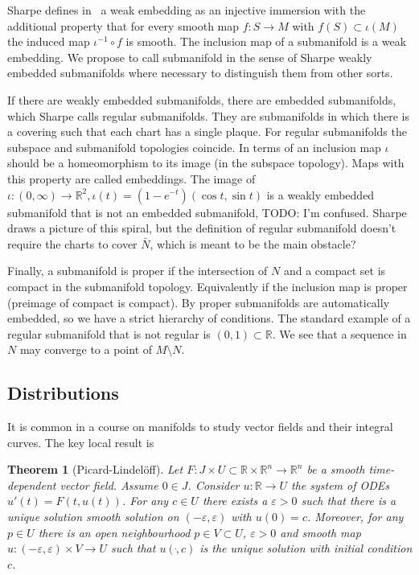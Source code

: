 \documentclass[twoside,11pt,a4paper,leqno]{article}
\numberwithin{equation}{section}
\theoremstyle{plain}
\newtheorem{theorem}[equation]{Theorem}
\theoremstyle{definition}
\newcommand{\bbR}{\mathbb{R}}
\begin{document}
Sharpe defines in~\cite[Definition~1.1.4]{Sharpe1997} a weak embedding as an injective immersion with the additional property that for every smooth map $f : S \to M$ with $f(S) \subset \iota(M)$ the induced map $\iota^{-1} \circ f$ is smooth.
The inclusion map of a submanifold is a weak embedding.
We propose to call submanifold in the sense of Sharpe weakly embedded submanifolds where necessary to distinguish them from other sorts.

If there are weakly embedded submanifolds, there are embedded submanifolds, which Sharpe calls regular submanifolds.
They are submanifolds in which there is a covering such that each chart has a single plaque.
For regular submanifolds the subspace and submanifold topologies coincide.
In terms of an inclusion map $\iota$ should be a homeomorphism to its image (in the subspace topology).
Maps with this property are called embeddings.
The image of $\iota : (0,\infty) \to \bbR^2, \iota(t) = (1-e^{-t})(\cos t, \sin t)$ is a weakly embedded submanifold that is not an embedded submanifold, 
TODO: I'm confused. Sharpe draws a picture of this spiral, but the definition of regular submanifold doesn't require the charts to cover $\bar{N}$, which is meant to be the main obstacle?

Finally, a submanifold is proper if the intersection of $N$ and a compact set is compact in the submanifold topology.
Equivalently if the inclusion map is proper (preimage of compact is compact).
By \cite[Theorem~1.2.11]{Sharpe1997} proper submanifolds are automatically embedded, so we have a strict hierarchy of conditions.
The standard example of a regular submanifold that is not regular is $(0,1) \subset \bbR$.
We see that a sequence in $N$ may converge to a point of $M\setminus N$.


\subsection{Distributions}

It is common in a course on manifolds to study vector fields and their integral curves.
The key local result is
\begin{theorem}[Picard-Lindelöff]
Let $F : J \times U \subset \bbR\times\bbR^n \to \bbR^n$ be a smooth time-dependent vector field. 
Assume $0 \in J$. 
Consider $u : \bbR \to U$ the system of ODEs $u'(t) = F(t,u(t))$.
For any $c \in U$ there exists a $\varepsilon > 0$ such that there is a unique solution smooth solution on $(-\varepsilon,\varepsilon)$ with $u(0) = c$.
Moreover, for any $p \in U$ there is an open neighbourhood $p \in V \subset U$, $\varepsilon > 0$ and smooth map $u : (-\varepsilon,\varepsilon) \times V \to U$ such that $u(\dot,c)$ is the unique solution with initial condition $c$.
\\\textup{\cite[Theorem~2.1.1]{Sharpe1997}}\cite[Theorem~1.2.1]{Ivey}
\end{theorem}
\end{document}
